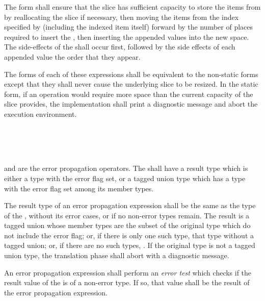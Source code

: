 \specsubsubitem
The  form shall ensure that the slice has sufficient capacity
to store the items from  by reallocating the slice
if necessary, then moving the items from the index specified by
 (including the indexed item itself) forward
by the number of places required to insert the ,
then inserting the appended values into the new space. The side-effects of the
 shall occur first, followed by the side
effects of each appended value the order that they appear.

\specsubsubitem
The  forms of each of these expressions shall be equivalent to
the non-static forms except that they shall never cause the underlying slice to
be resized. In the static form, if an operation would require more space than
the current capacity of the slice provides, the implementation shall print a
diagnostic message and abort the execution environment.


\begin{grammar}
 \\
	  \\
	 \terminal{!} \\
\end{grammar}

\specsubsubitem
{} and \terminal{!} are the error propagation operators. The
 shall have a result type which is either a
type with the error flag set, or a tagged union type which has a type with the
error flag set among its member types.

\specsubsubitem
The result type of an error propagation expression shall be the same as the
type of the , without its error cases, or
 if no non-error types remain. The result is a tagged union
whose member types are the subset of the original type which do not include the
error flag; or, if there is only one such type, that type without a tagged
union; or, if there are no such types, . If the original type is
not a tagged union type, the translation phase shall abort with a diagnostic
message.

\specsubsubitem
An error propagation expression shall perform an \textit{error test} which
checks if the result value of the  is of a
non-error type. If so, that value shall be the result of the error propagation
expression.

